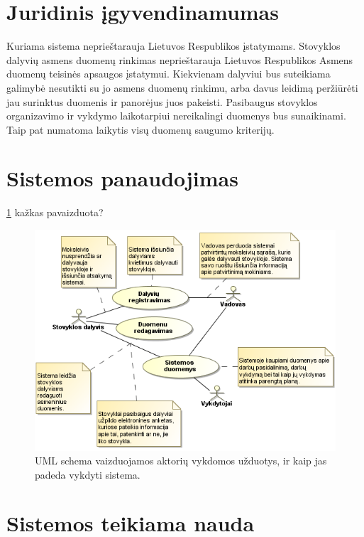 \section{Juridinis įgyvendinamumas}

Kuriama sistema neprieštarauja Lietuvos Respublikos įstatymams. Stovyklos dalyvių asmens duomenų rinkimas neprieštarauja Lietuvos Respublikos Asmens duomenų teisinės apsaugos įstatymui. Kiekvienam dalyviui bus suteikiama galimybė nesutikti su jo asmens duomenų rinkimu, arba davus leidimą peržiūrėti jau surinktus duomenis ir panorėjus juos pakeisti. Pasibaugus stovyklos organizavimo ir vykdymo laikotarpiui nereikalingi duomenys bus sunaikinami. Taip pat numatoma laikytis visų duomenų saugumo kriterijų.

\section{Sistemos panaudojimas}


\ref{fig:uml_tasks} kažkas pavaizduota?

\begin{figure}[htb]
  \begin{center}
    \includegraphics[scale=0.8]{images/sistemos_panaudojimas.png}
  \end{center}
  \caption{UML schema vaizduojamos aktorių vykdomos užduotys, ir kaip jas
    padeda vykdyti sistema.}
  \label{fig:uml_tasks}
\end{figure}

\section{Sistemos teikiama nauda}

